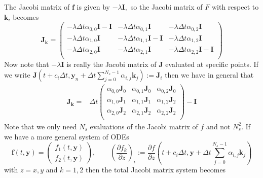\documentclass[10pt,a4paper]{article}
\newcommand{\bvec}[1]{\mathbf{#1}}
\begin{document}
The Jacobi matrix of $\bvec{f}$ is given by $-\lambda \bvec{I},$ so the Jacobi matrix of $F$ with respect to $\bvec{k}_i$ becomes
\begin{equation*}
  \bvec{J}_\bvec{k} = \begin{pmatrix}
    -\lambda \Delta t \alpha_{0,0}\bvec{I} - \bvec{I} & -\lambda \Delta t \alpha_{0,1}\bvec{I} & -\lambda \Delta t \alpha_{0,2}\bvec{I} \\
    -\lambda \Delta t \alpha_{1,0}\bvec{I}  & -\lambda \Delta t \alpha_{1,1}\bvec{I}  - \bvec{I} & -\lambda \Delta t \alpha_{1,2}\bvec{I} \\
    -\lambda \Delta t \alpha_{2,0}\bvec{I} & -\lambda \Delta t \alpha_{2,1}\bvec{I} & -\lambda \Delta t \alpha_{2,2}\bvec{I} - \bvec{I} \\
  \end{pmatrix}
\end{equation*}
Now note that $-\lambda \bvec{I}$ is really the Jacobi matrix of $\bvec{J}$ evaluated at specific points. If we write $\bvec{J}\left( t + c_i \Delta t, \bvec{y}_n + \Delta t \sum_{j=0}^{N_s-1} \alpha_{i,j} \bvec{k}_j \right) := \bvec{J}_{i}$ then we have in general that
\begin{align*}
  \bvec{J}_\bvec{k} =& \Delta t\begin{pmatrix}
      \alpha_{0,0} \bvec{J}_0 &  \alpha_{0,1} \bvec{J}_0 &  \alpha_{0,2} \bvec{J}_0 \\
     \alpha_{1,0} \bvec{J}_1  &  \alpha_{1,1} \bvec{J}_1   &  \alpha_{1,2} \bvec{J}_2 \\
     \alpha_{2,0} \bvec{J}_2 &  \alpha_{2,1} \bvec{J}_2 &  \alpha_{2,2} \bvec{J}_2  \\
   \end{pmatrix} - \bvec{I}
\end{align*}
Note that we only need $N_s$ evaluations of the Jacobi matrix of $f$ and not $N_s^2.$
If we have a more general system of ODEs
\begin{equation*}
  \bvec{f}(t,\bvec{y}) = \begin{pmatrix} f_1( t, \bvec{y} ) \\
    f_2( t, \bvec{y} ) 
  \end{pmatrix}, \qquad \left(\frac{\partial f_k}{\partial z}\right)_i := \frac{ \partial f}{\partial z}\left(t + c_i \Delta t, \bvec{y} + \Delta t \sum_{j=0}^{N_s-1}\alpha_{i,j} \bvec{k}_j\right)
\end{equation*}
with $z = x,y$ and $k = 1,2$ then the total Jacobi matrix system becomes
\end{document}
